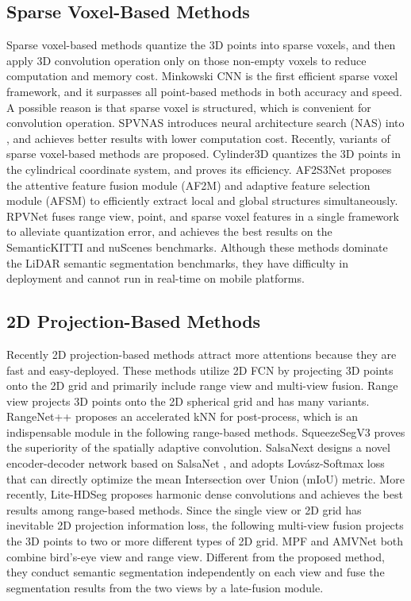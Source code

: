 \documentclass[letterpaper, 10 pt, conference]{ieeeconf}
\begin{document}
\subsection{Sparse Voxel-Based Methods}
Sparse voxel-based methods quantize the 3D points into sparse voxels, and then apply 3D convolution operation only on those non-empty voxels to reduce computation and memory cost. Minkowski CNN \cite{choy20194d} is the first efficient sparse voxel framework, and it surpasses all point-based methods in both accuracy and speed. A possible reason is that sparse voxel is structured, which is convenient for convolution operation. SPVNAS \cite{tang2020searching} introduces neural architecture search (NAS) into \cite{choy20194d}, and achieves better results with lower computation cost. Recently, variants \cite{zhu2021cylindrical, cheng20212, xu2021rpvnet} of sparse voxel-based methods are proposed. Cylinder3D \cite{zhu2021cylindrical} quantizes the 3D points in the cylindrical coordinate system, and proves its efficiency. AF2S3Net \cite{cheng20212} proposes the attentive feature fusion module (AF2M) and adaptive feature selection module (AFSM) to efficiently extract local and global structures simultaneously. RPVNet \cite{xu2021rpvnet} fuses range view, point, and sparse voxel features in a single framework to alleviate quantization error, and achieves the best results on the SemanticKITTI and nuScenes benchmarks. Although these methods dominate the LiDAR semantic segmentation benchmarks, they have difficulty in deployment and cannot run in real-time on mobile platforms.

\subsection{2D Projection-Based Methods}
Recently 2D projection-based methods attract more attentions because they are fast and easy-deployed. These methods utilize 2D FCN by projecting 3D points onto the 2D grid and primarily include range view and multi-view fusion. Range view projects 3D points onto the 2D spherical grid and has many variants. RangeNet++ \cite{milioto2019rangenetplus} proposes an accelerated kNN for post-process, which is an indispensable module in the following range-based methods. SqueezeSegV3  \cite{xu2020squeezesegv3} proves the superiority of the spatially adaptive convolution. SalsaNext \cite{cortinhal2020salsanext} designs a novel encoder-decoder network based on SalsaNet \cite{aksoy2020salsanet}, and adopts Lov{\'a}sz-Softmax loss \cite{berman2018lovasz} that can directly optimize the mean Intersection over Union (mIoU) metric. More recently, Lite-HDSeg \cite{razani2021lite} proposes harmonic dense convolutions and achieves the best results among range-based methods. Since the single view or 2D grid has inevitable 2D projection information loss, the following multi-view fusion projects the 3D points to two or more different types of 2D grid. MPF \cite{alnaggar2021multi} and AMVNet \cite{liong2020amvnet} both combine bird’s-eye view and range view. Different from the proposed method, they conduct semantic segmentation independently on each view and fuse the segmentation results from the two views by a late-fusion module.
\end{document}
